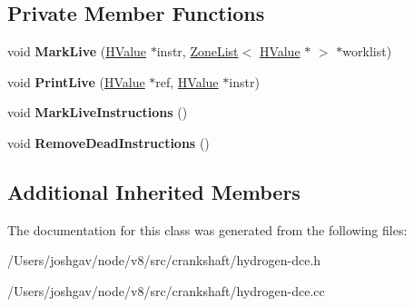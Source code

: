 \subsection*{Private Member Functions}
\begin{DoxyCompactItemize}
\item 
void {\bfseries Mark\+Live} (\hyperlink{classv8_1_1internal_1_1_h_value}{H\+Value} $\ast$instr, \hyperlink{classv8_1_1internal_1_1_zone_list}{Zone\+List}$<$ \hyperlink{classv8_1_1internal_1_1_h_value}{H\+Value} $\ast$ $>$ $\ast$worklist)\hypertarget{classv8_1_1internal_1_1_h_dead_code_elimination_phase_a4c72d901085e6bb629323d09ce1701b0}{}\label{classv8_1_1internal_1_1_h_dead_code_elimination_phase_a4c72d901085e6bb629323d09ce1701b0}

\item 
void {\bfseries Print\+Live} (\hyperlink{classv8_1_1internal_1_1_h_value}{H\+Value} $\ast$ref, \hyperlink{classv8_1_1internal_1_1_h_value}{H\+Value} $\ast$instr)\hypertarget{classv8_1_1internal_1_1_h_dead_code_elimination_phase_aeb5208aa0520e8aa1d562aea66b9ca25}{}\label{classv8_1_1internal_1_1_h_dead_code_elimination_phase_aeb5208aa0520e8aa1d562aea66b9ca25}

\item 
void {\bfseries Mark\+Live\+Instructions} ()\hypertarget{classv8_1_1internal_1_1_h_dead_code_elimination_phase_a73df0641d3679228417134487ca1fa8e}{}\label{classv8_1_1internal_1_1_h_dead_code_elimination_phase_a73df0641d3679228417134487ca1fa8e}

\item 
void {\bfseries Remove\+Dead\+Instructions} ()\hypertarget{classv8_1_1internal_1_1_h_dead_code_elimination_phase_a1e74d7059cc5c45468acdab4e9051fee}{}\label{classv8_1_1internal_1_1_h_dead_code_elimination_phase_a1e74d7059cc5c45468acdab4e9051fee}

\end{DoxyCompactItemize}
\subsection*{Additional Inherited Members}


The documentation for this class was generated from the following files\+:\begin{DoxyCompactItemize}
\item 
/\+Users/joshgav/node/v8/src/crankshaft/hydrogen-\/dce.\+h\item 
/\+Users/joshgav/node/v8/src/crankshaft/hydrogen-\/dce.\+cc\end{DoxyCompactItemize}
